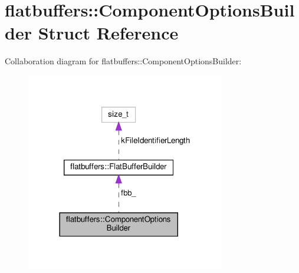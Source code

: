\hypertarget{structflatbuffers_1_1ComponentOptionsBuilder}{}\section{flatbuffers\+:\+:Component\+Options\+Builder Struct Reference}
\label{structflatbuffers_1_1ComponentOptionsBuilder}


Collaboration diagram for flatbuffers\+:\+:Component\+Options\+Builder\+:
\nopagebreak
\begin{figure}[H]
\begin{center}
\leavevmode
\includegraphics[width=246pt]{structflatbuffers_1_1ComponentOptionsBuilder__coll__graph}
\end{center}
\end{figure}
